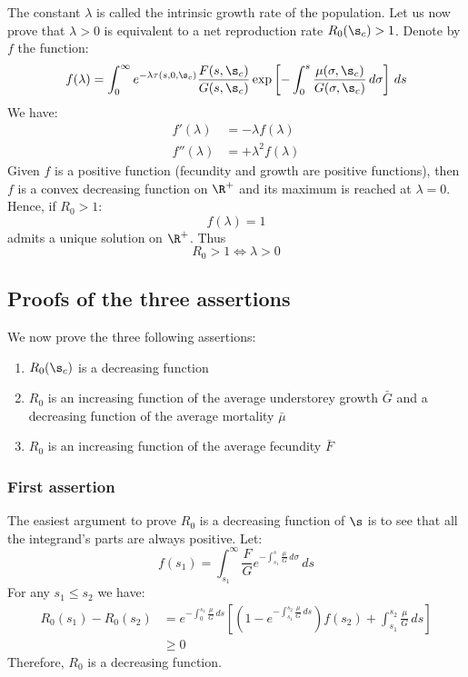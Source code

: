 \begin{refsection}
The constant $ \lambda $ is called the intrinsic growth rate of the population. Let us now prove that $ \lambda > 0 $ is equivalent to a net reproduction rate $ R_0(\s_c) > 1 $. Denote by $ f $ the function:
\[
	f(\lambda) = \int_{0}^{\infty} e^{- \lambda \tau(s, 0, \s_c)} \frac{F(s, \s_c)}{G(s, \s_c)} \exp \left[ -\int_{0}^{s} \frac{\mu(\sigma, \s_c)}{G(\sigma, \s_c)} \, d\sigma \right] \, ds
\]
We have:
\begin{align*}
	f'(\lambda) &= -\lambda f(\lambda) \\
	f''(\lambda) &= +\lambda^2 f(\lambda)
\end{align*}
Given $ f $ is a positive function (fecundity and growth are positive functions), then $ f $ is a convex decreasing function on $ \R^{+} $ and its maximum is reached at $ \lambda = 0 $. Hence, if $ R_0 > 1 $:
\[
	f(\lambda) = 1
\]
admits a unique solution on $ \R^{+} $. Thus
\[
	R_0 > 1 \Leftrightarrow \lambda > 0
\]

\subsection{Proofs of the three assertions \label{app::calc_R0::sec::3asser}}
We now prove the three following assertions:
\begin{enumerate}[label=(\textit{\roman*})]
	\item $ R_0(\s_c) $ is a decreasing function
	\item $ R_0 $ is an increasing function of the average understorey growth $ \bar{G} $ and a decreasing function of the average mortality $ \bar{\mu} $
	\item $ R_0 $ is an increasing function of the average fecundity $ \bar{F} $
\end{enumerate}

\subsubsection{First assertion}
The easiest argument to prove $ R_0 $ is a decreasing function of $ \s $ is to see that all the integrand's parts are always positive. Let:
\[
	f(s_1) = \int_{s_1}^{\infty} \frac{F}{G} e^{-\int_{s_1}^s \frac{\mu}{G} \, d\sigma} \, ds
\]
For any $ s_1 \leqslant s_2 $ we have:
\begin{align*}
	R_0(s_1) - R_0(s_2) &= e^{-\int_{0}^{s_1} \frac{\mu}{G} \, ds} \left[ \left( 1 - e^{-\int_{s_1}^{s_2} \frac{\mu}{G} \, ds} \right) f(s_2) + \int_{s_1}^{s_2} \frac{\mu}{G} \, ds \right] \\
		&\geqslant 0
\end{align*}
Therefore, $ R_0 $ is a decreasing function.


\end{refsection}
